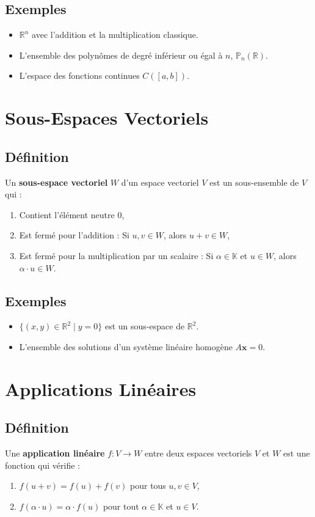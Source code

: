 \documentclass[12pt,a4paper]{article}
\begin{document}
\subsection*{Exemples}
\begin{itemize}
    \item \( \mathbb{R}^n \) avec l'addition et la multiplication classique.
    \item L'ensemble des polynômes de degré inférieur ou égal à \( n \), \( \mathbb{P}_n(\mathbb{R}) \).
    \item L'espace des fonctions continues \( C([a, b]) \).
\end{itemize}

\section{Sous-Espaces Vectoriels}
\subsection*{Définition}
Un \textbf{sous-espace vectoriel} \( W \) d'un espace vectoriel \( V \) est un sous-ensemble de \( V \) qui :
\begin{enumerate}
    \item Contient l'élément neutre \( 0 \),
    \item Est fermé pour l'addition : Si \( u, v \in W \), alors \( u + v \in W \),
    \item Est fermé pour la multiplication par un scalaire : Si \( \alpha \in \mathbb{K} \) et \( u \in W \), alors \( \alpha \cdot u \in W \).
\end{enumerate}

\subsection*{Exemples}
\begin{itemize}
    \item \( \{(x, y) \in \mathbb{R}^2 \mid y = 0 \} \) est un sous-espace de \( \mathbb{R}^2 \).
    \item L'ensemble des solutions d'un système linéaire homogène \( A \mathbf{x} = 0 \).
\end{itemize}

\section{Applications Linéaires}
\subsection*{Définition}
Une \textbf{application linéaire} \( f : V \to W \) entre deux espaces vectoriels \( V \) et \( W \) est une fonction qui vérifie :
\begin{enumerate}
    \item \( f(u + v) = f(u) + f(v) \) pour tous \( u, v \in V \),
    \item \( f(\alpha \cdot u) = \alpha \cdot f(u) \) pour tout \( \alpha \in \mathbb{K} \) et \( u \in V \).
\end{enumerate}
\end{document}
